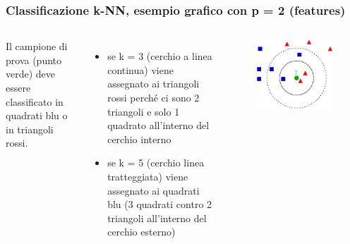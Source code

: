 \begin{frame}

	\frametitle{Classificazione k-NN, esempio grafico con p = 2 (features)}

	\begin{columns}

		Il campione di prova (punto verde) deve essere classificato in quadrati blu o in triangoli rossi.
		\begin{itemize}
			\item se k = 3 (cerchio a linea continua) viene assegnato ai triangoli rossi perché ci sono 2 triangoli e solo 1 quadrato all'interno del cerchio interno
			\item se k = 5 (cerchio linea tratteggiata) viene assegnato ai quadrati blu (3 quadrati contro 2 triangoli all'interno del cerchio esterno)
		\end{itemize}


		\begin{figure}[!htbp]
			\centering
			\includegraphics[width=0.75\linewidth]{images/supervised/knn_classification/knn_classification_radius.pdf}
		\end{figure}

	\end{columns}

\end{frame}

